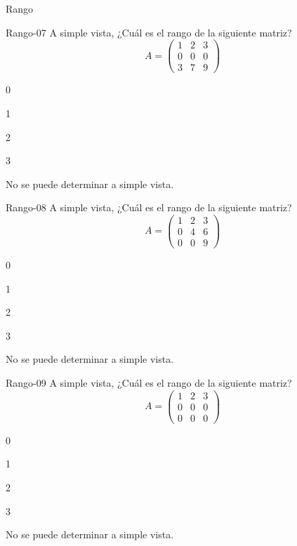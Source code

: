 \documentclass[a4,11pt]{aleph-notas}
\begin{document}
\begin{quiz}{Rango}
\begin{multi}[]%
    {Rango-07}
    A simple vista, ¿Cuál es el rango de la siguiente matriz?
    \[
        A=\begin{pmatrix} 1 & 2 & 3 \\ 0 & 0 & 0 \\ 3 & 7 & 9 \end{pmatrix}
    \]
    \item 0
    \item 1
    \item 2
    \item 3
    \item* No se puede determinar a simple vista.
\end{multi}

\begin{multi}[]%
    {Rango-08}
    A simple vista, ¿Cuál es el rango de la siguiente matriz?
    \[
        A=\begin{pmatrix} 1 & 2 & 3 \\ 0 & 4 & 6 \\ 0 & 0 & 9 \end{pmatrix}
    \]
    \item 0
    \item 1
    \item 2
    \item* 3
    \item No se puede determinar a simple vista.
\end{multi}

\begin{multi}[]%
    {Rango-09}
    A simple vista, ¿Cuál es el rango de la siguiente matriz?
    \[
        A=\begin{pmatrix} 1 & 2 & 3 \\ 0 & 0 & 0 \\ 0 & 0 & 0 \end{pmatrix}
    \]
    \item 0
    \item* 1
    \item 2
    \item 3
    \item No se puede determinar a simple vista.
\end{multi}


\end{quiz}
\end{document}
